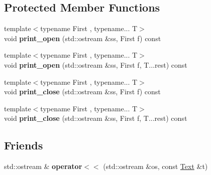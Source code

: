 \subsection*{Protected Member Functions}
\begin{DoxyCompactItemize}
\item 
\hypertarget{classlatex_1_1Text_a0698c08485898d3d3a1515b6df2b9899}{{\footnotesize template$<$typename First , typename... T$>$ }\\void {\bfseries print\-\_\-open} (std\-::ostream \&ss, First f) const }\label{classlatex_1_1Text_a0698c08485898d3d3a1515b6df2b9899}

\item 
\hypertarget{classlatex_1_1Text_a30409704fa5fbf24ad67a6ccc74e9a62}{{\footnotesize template$<$typename First , typename... T$>$ }\\void {\bfseries print\-\_\-open} (std\-::ostream \&ss, First f, T...\-rest) const }\label{classlatex_1_1Text_a30409704fa5fbf24ad67a6ccc74e9a62}

\item 
\hypertarget{classlatex_1_1Text_a87ffdecea2103f1fb0a1ad5a4d9d790a}{{\footnotesize template$<$typename First , typename... T$>$ }\\void {\bfseries print\-\_\-close} (std\-::ostream \&ss, First f) const }\label{classlatex_1_1Text_a87ffdecea2103f1fb0a1ad5a4d9d790a}

\item 
\hypertarget{classlatex_1_1Text_aab9338b600852c1f5113239f50bb031b}{{\footnotesize template$<$typename First , typename... T$>$ }\\void {\bfseries print\-\_\-close} (std\-::ostream \&ss, First f, T...\-rest) const }\label{classlatex_1_1Text_aab9338b600852c1f5113239f50bb031b}

\end{DoxyCompactItemize}
\subsection*{Friends}
\begin{DoxyCompactItemize}
\item 
\hypertarget{classlatex_1_1Text_a38c082a0cd5fe7844698b04bc1bbb31f}{std\-::ostream \& {\bfseries operator$<$$<$} (std\-::ostream \&os, const \hyperlink{classlatex_1_1Text}{Text} \&t)}\label{classlatex_1_1Text_a38c082a0cd5fe7844698b04bc1bbb31f}

\end{DoxyCompactItemize}


